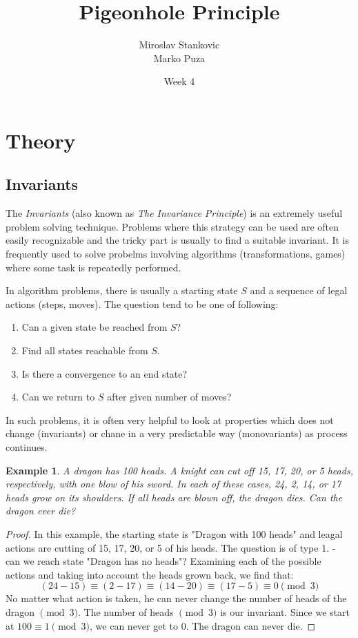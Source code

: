 \documentclass[11pt,a5paper]{article}
\title{\textbf{Pigeonhole Principle}}
\date{Week 4}
\author{Miroslav Stankovic\\ Marko Puza}
\newtheorem{theorem}{Example}
\begin{document}
\maketitle

\section{Theory}
\subsection*{Invariants}

The \emph{Invariants} (also known as \emph{The Invariance Principle}) is an extremely useful problem solving technique. Problems where this strategy can be used are often easily recognizable and the tricky part is usually to find a suitable invariant. It is frequently used to solve probelms involving algorithms (transformations, games) where some task is repeatedly performed. 

In algorithm problems, there is usually a starting state $S$ and a sequence of legal actions (steps, moves). The question tend to be one of following: 
\begin{enumerate}
\item {Can a given state be reached from $S$?}
\item {Find all states reachable from $S$.}
\item {Is there a convergence to an end state?}
\item {Can we return to $S$ after given number of moves?}
\end{enumerate}

In such problems, it is often very helpful to look at properties which does not change (invariants) or chane in a very predictable way (monovariants) as process continues. 

\begin{theorem}
	A dragon has 100 heads. A knight can cut off 15, 17, 20, or 5 heads, respectively, with one blow of his sword. In each of these cases, 24, 2, 14, or 17 heads grow on its shoulders. If all heads are blown off, the dragon dies. Can the dragon ever die?
\end{theorem}
\begin{proof}
	In this example, the starting state is "Dragon with 100 heads" and leagal actions are cutting of 15, 17, 20, or 5 of his heads. The question is of type 1. - can we reach state "Dragon has no heads"?
	Examining each of the possible actions and taking into account the heads grown back, we find that:
	\[(24 - 15) \equiv (2 - 17) \equiv (14 - 20) \equiv (17 - 5) \equiv 0 \pmod 3\]
No matter what action is taken, he can never change the number of heads of the dragon $\pmod 3$. The number of heads $\pmod 3$ is our invariant. Since we start at $100 \equiv 1 \pmod 3$, we can never get to $0$. The dragon can never die.
\end{proof}
\end{document}
